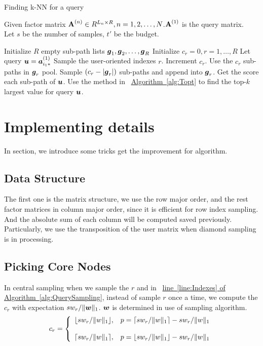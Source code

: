 \documentclass[letterpaper]{article}
\newcommand{\V}[1]{{\bm{{\MakeLowercase{#1}}}}}
\newcommand{\VnC}[3]{\V{#1}^{(#2)}_{#3}}
\newcommand{\M}[1]{{\bm{\mathbf{\MakeUppercase{#1}}}}}
\newcommand{\norm}[2]{\|#1\|_{#2}}
\newcommand{\Alg}[1] {\hyperref[alg:#1] {Algorithm~\ref*{alg:#1}}}
\newcommand{\AlgLine}[2]{\hyperref[alg:#1]{line~\ref*{line:#2} of Algorithm~\ref*{alg:#1}}}
\begin{document}
\begin{algorithm}[t]
    \caption{Finding k-NN for a query}\label{alg:QuerySampling}
        Given factor matrix $\M{A}^{(n)}\in R^{L_n\times R}, n = 1,2,\ldots,N$.$\M{A}^{(1)}$ is the query matrix.\\
        Let $s$ be the number of samples, $t'$ be the budget.
    \begin{algorithmic}[1]
    \State Initialize $R$ empty sub-path lists $\V{g}_1,\V{g}_2,\ldots,\V{g}_R$
    \State Initialize $c_r = 0,r= 1,\ldots,R$
    \State Let query $\V{u}=\VnC{a}{1}{i_1*}$
    \State Sample the user-oriented indexes $r$. \label{line:Indexes}
    \State  Increment $c_r$.
    \EndFor
    \If {$c_r\leq |\V{g}_r|$ }
    \State Use the $c_r$ sub-paths in $\V{g}_r$ pool.
    \Else
    \State Sample $(c_r - |\V{g}_r|)$ sub-paths and append into $\V{g}_r$.
    \EndIf
    \State Get the score each sub-path of $\V{u}$.
    \State Use the method in ~\Alg{Topt} to find the top-$k$ largest value for query $\V{u}$.
    \EndFor
    \EndFor
    \end{algorithmic}
\end{algorithm}



\section{Implementing details}
In section, we introduce some tricks get the improvement for algorithm.

\subsection{Data Structure}
The first one is the matrix structure, we use the row major order, and the rest factor matrices in column major order, since it is efficient for row index sampling. And the absolute sum of each column  will be computed saved previously. Particularly, we use the transposition of the user matrix when diamond sampling is in processing.

\subsection{Picking Core Nodes}
In central sampling when we sample the $r$ and in ~\AlgLine{QuerySampling}{Indexes}, instead of sample $r$ once a time, we compute the $c_r$ with expectation $sw_r/\norm{\V{w}}{1}$. $\V{w}$ is determined in use of sampling algorithm.
\begin{equation*}c_r=
    \left\{
      \begin{array}{ll}
        \lfloor sw_r/\norm{w}{1} \rfloor,
        & \hbox{$p=\lceil sw_r/\norm{w}{1} \rceil - sw_r/\norm{w}{1}$} \\\\
        \lceil sw_r/\norm{w}{1} \rceil,
        & \hbox{$p=\lfloor sw_r/\norm{w}{1} \rfloor - sw_r/\norm{w}{1}$}
      \end{array}
    \right.
\end{equation*}
\end{document}
